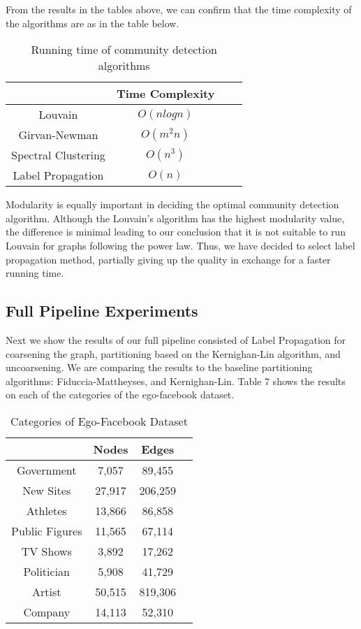 From the results in the tables above, we can confirm that the time complexity of the algorithms are as in the table below.

\begin{table}[H]
\centering
\caption{Running time of community detection algorithms}
\label{t1}
\begin{tabular}{|c|c|c|c}
\noalign{\smallskip}\noalign{\smallskip}\hline
& Time Complexity\\
\hline
Louvain & $O(nlogn)$\\
\hline
Girvan-Newman & $O(m^{2}n)$ \\
\hline
Spectral Clustering & $O(n^{3})$ \\
\hline
Label Propagation  & $O(n)$\\
\hline
\end{tabular}
\end{table}

Modularity is equally important in deciding the optimal community detection algorithm. Although the Louvain's algorithm has the highest modularity value, the difference is minimal leading to our conclusion that it is not suitable to run Louvain for graphs following the power law. Thus, we have decided to select label propagation method, partially giving up the quality in exchange for a faster running time. 
\\
\subsection{Full Pipeline Experiments}
Next we show the results of our full pipeline consisted of Label Propagation for coarsening the graph, partitioning based on the Kernighan-Lin algorithm, and uncoarsening. We are comparing the results to the baseline partitioning algorithms: Fiduccia-Mattheyses, and Kernighan-Lin. Table 7 shows the results on each of the categories of the ego-facebook dataset.
\begin{table}[H]
\centering
\caption{Categories of Ego-Facebook Dataset}
\label{t1}
\begin{tabular}{|c|c|c|c|}
\noalign{\smallskip}\noalign{\smallskip}\hline
& Nodes & Edges\\
\hline
Government & 7,057 & 89,455\\
\hline
New Sites & 27,917 & 206,259\\
\hline
Athletes & 13,866 & 86,858 \\
\hline
Public Figures & 11,565 & 67,114\\
\hline
TV Shows & 3,892 & 17,262\\
\hline
Politician & 5,908 & 41,729 \\
\hline
Artist & 50,515 & 819,306 \\
\hline
Company & 14,113 & 52,310 \\
\hline
\end{tabular}
\end{table}

